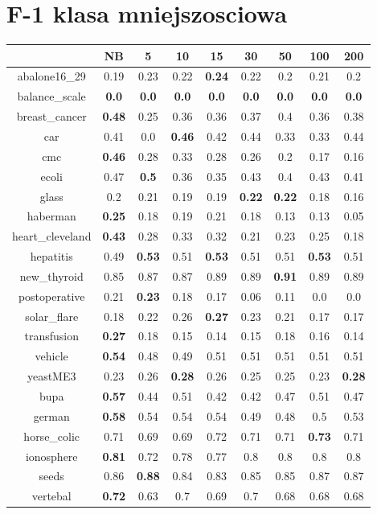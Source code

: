 \documentclass{article}%
\begin{document}
%
\section*{F{-}1 klasa mniejszosciowa}%
\begin{tabular}{c|cccccccc}%
\hline%
&NB&5&10&15&30&50&100&200\\%
\hline%
abalone16\_29&0.19&0.23&0.22&\textbf{0.24}&0.22&0.2&0.21&0.2\\%
\hline%
balance\_scale&\textbf{0.0}&\textbf{0.0}&\textbf{0.0}&\textbf{0.0}&\textbf{0.0}&\textbf{0.0}&\textbf{0.0}&\textbf{0.0}\\%
\hline%
breast\_cancer&\textbf{0.48}&0.25&0.36&0.36&0.37&0.4&0.36&0.38\\%
\hline%
car&0.41&0.0&\textbf{0.46}&0.42&0.44&0.33&0.33&0.44\\%
\hline%
cmc&\textbf{0.46}&0.28&0.33&0.28&0.26&0.2&0.17&0.16\\%
\hline%
ecoli&0.47&\textbf{0.5}&0.36&0.35&0.43&0.4&0.43&0.41\\%
\hline%
glass&0.2&0.21&0.19&0.19&\textbf{0.22}&\textbf{0.22}&0.18&0.16\\%
\hline%
haberman&\textbf{0.25}&0.18&0.19&0.21&0.18&0.13&0.13&0.05\\%
\hline%
heart\_cleveland&\textbf{0.43}&0.28&0.33&0.32&0.21&0.23&0.25&0.18\\%
\hline%
hepatitis&0.49&\textbf{0.53}&0.51&\textbf{0.53}&0.51&0.51&\textbf{0.53}&0.51\\%
\hline%
new\_thyroid&0.85&0.87&0.87&0.89&0.89&\textbf{0.91}&0.89&0.89\\%
\hline%
postoperative&0.21&\textbf{0.23}&0.18&0.17&0.06&0.11&0.0&0.0\\%
\hline%
solar\_flare&0.18&0.22&0.26&\textbf{0.27}&0.23&0.21&0.17&0.17\\%
\hline%
transfusion&\textbf{0.27}&0.18&0.15&0.14&0.15&0.18&0.16&0.14\\%
\hline%
vehicle&\textbf{0.54}&0.48&0.49&0.51&0.51&0.51&0.51&0.51\\%
\hline%
yeastME3&0.23&0.26&\textbf{0.28}&0.26&0.25&0.25&0.23&\textbf{0.28}\\%
\hline%
bupa&\textbf{0.57}&0.44&0.51&0.42&0.42&0.47&0.51&0.47\\%
\hline%
german&\textbf{0.58}&0.54&0.54&0.54&0.49&0.48&0.5&0.53\\%
\hline%
horse\_colic&0.71&0.69&0.69&0.72&0.71&0.71&\textbf{0.73}&0.71\\%
\hline%
ionosphere&\textbf{0.81}&0.72&0.78&0.77&0.8&0.8&0.8&0.8\\%
\hline%
seeds&0.86&\textbf{0.88}&0.84&0.83&0.85&0.85&0.87&0.87\\%
\hline%
vertebal&\textbf{0.72}&0.63&0.7&0.69&0.7&0.68&0.68&0.68\\%
\hline%
\end{tabular}
\end{document}
